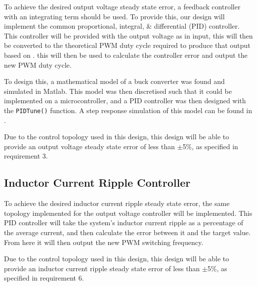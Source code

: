 To achieve the desired output voltage steady state error, a feedback controller with an integrating term should be used. To provide this, our design will implement the common proportional, integral, \& differential (PID) controller. This controller will be provided with the output voltage as in input, this will then be converted to the theoretical PWM duty cycle required to produce that output based on . this will then be used to calculate the controller error and output the new PWM duty cycle.

To design this, a mathematical model of a buck converter \cite{Patil2015} was found and simulated in Matlab. This model was then discretised such that it could be implemented on a microcontroller, and a PID controller was then designed with the \lstinline{PIDTune()} function. A step response simulation of this model can be found in . 

Due to the control topology used in this design, this design will be able to provide an output voltage steady state error of less than $\pm$5\%, as specified in requirement 3.

\subsection{Inductor Current Ripple Controller}\label{S:ripple_control_design}

To achieve the desired inductor current ripple steady state error, the same topology implemented for the output voltage controller will be implemented. This PID controller will take the system's inductor current ripple as a percentage of the average current, and then calculate the error between it and the target value. From here it will then output the new PWM switching frequency. 

Due to the control topology used in this design, this design will be able to provide an inductor current ripple steady state error of less than $\pm$5\%, as specified in requirement 6.




